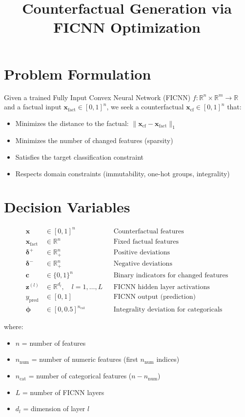 \documentclass{article}
\title{Counterfactual Generation via FICNN Optimization}
\author{}
\date{}
\begin{document}
\maketitle

\section{Problem Formulation}

Given a trained Fully Input Convex Neural Network (FICNN) $f: \mathbb{R}^n \times \mathbb{R}^m \to \mathbb{R}$ and a factual input $\mathbf{x}_{\text{fact}} \in [0,1]^n$, we seek a counterfactual $\mathbf{x}_{\text{cf}} \in [0,1]^n$ that:
\begin{itemize}
    \item Minimizes the distance to the factual: $\|\mathbf{x}_{\text{cf}} - \mathbf{x}_{\text{fact}}\|_1$
    \item Minimizes the number of changed features (sparsity)
    \item Satisfies the target classification constraint
    \item Respects domain constraints (immutability, one-hot groups, integrality)
\end{itemize}

\section{Decision Variables}

\begin{align}
\mathbf{x} &\in [0,1]^n && \text{Counterfactual features} \\
\mathbf{x}_{\text{fact}} &\in \mathbb{R}^n && \text{Fixed factual features} \\
\boldsymbol{\delta}^+ &\in \mathbb{R}_+^n && \text{Positive deviations} \\
\boldsymbol{\delta}^- &\in \mathbb{R}_+^n && \text{Negative deviations} \\
\mathbf{c} &\in \{0,1\}^n && \text{Binary indicators for changed features} \\
\mathbf{z}^{(l)} &\in \mathbb{R}^{d_l}, \quad l=1,\ldots,L && \text{FICNN hidden layer activations} \\
y_{\text{pred}} &\in [0,1] && \text{FICNN output (prediction)} \\
\boldsymbol{\phi} &\in [0, 0.5]^{n_{\text{cat}}} && \text{Integrality deviation for categoricals}
\end{align}

where:
\begin{itemize}
    \item $n$ = number of features
    \item $n_{\text{num}}$ = number of numeric features (first $n_{\text{num}}$ indices)
    \item $n_{\text{cat}}$ = number of categorical features ($n - n_{\text{num}}$)
    \item $L$ = number of FICNN layers
    \item $d_l$ = dimension of layer $l$
\end{itemize}
\end{document}
